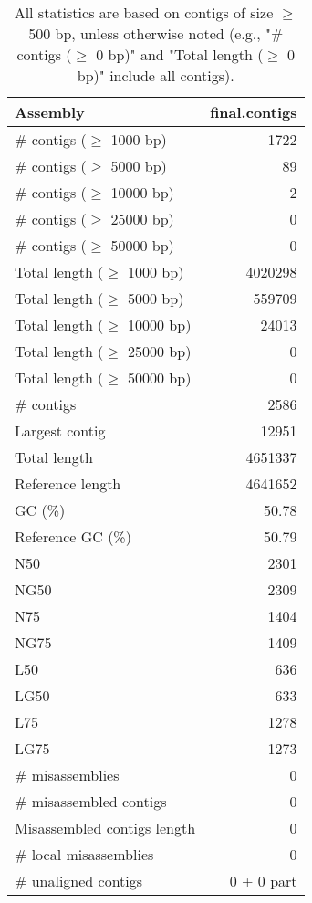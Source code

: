 \documentclass[12pt,a4paper]{article}
\begin{document}
\begin{table}[ht]
\begin{center}
\caption{All statistics are based on contigs of size $\geq$ 500 bp, unless otherwise noted (e.g., "\# contigs ($\geq$ 0 bp)" and "Total length ($\geq$ 0 bp)" include all contigs).}
\begin{tabular}{|l*{1}{|r}|}
\hline
Assembly & final.contigs \\ \hline
\# contigs ($\geq$ 1000 bp) & 1722 \\ \hline
\# contigs ($\geq$ 5000 bp) & 89 \\ \hline
\# contigs ($\geq$ 10000 bp) & 2 \\ \hline
\# contigs ($\geq$ 25000 bp) & 0 \\ \hline
\# contigs ($\geq$ 50000 bp) & 0 \\ \hline
Total length ($\geq$ 1000 bp) & 4020298 \\ \hline
Total length ($\geq$ 5000 bp) & 559709 \\ \hline
Total length ($\geq$ 10000 bp) & 24013 \\ \hline
Total length ($\geq$ 25000 bp) & 0 \\ \hline
Total length ($\geq$ 50000 bp) & 0 \\ \hline
\# contigs & 2586 \\ \hline
Largest contig & 12951 \\ \hline
Total length & 4651337 \\ \hline
Reference length & 4641652 \\ \hline
GC (\%) & 50.78 \\ \hline
Reference GC (\%) & 50.79 \\ \hline
N50 & 2301 \\ \hline
NG50 & 2309 \\ \hline
N75 & 1404 \\ \hline
NG75 & 1409 \\ \hline
L50 & 636 \\ \hline
LG50 & 633 \\ \hline
L75 & 1278 \\ \hline
LG75 & 1273 \\ \hline
\# misassemblies & 0 \\ \hline
\# misassembled contigs & 0 \\ \hline
Misassembled contigs length & 0 \\ \hline
\# local misassemblies & 0 \\ \hline
\# unaligned contigs & 0 + 0 part \\ \hline

\end{tabular}
\end{center}
\end{table}
\end{document}
